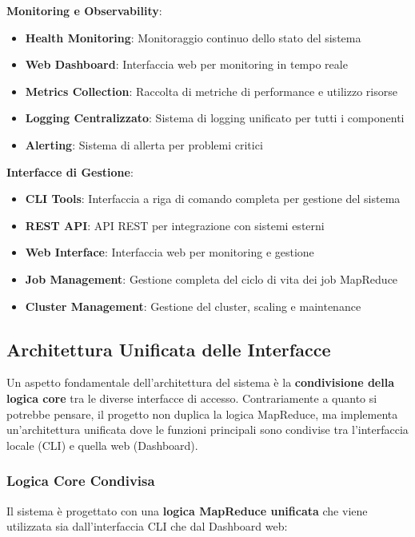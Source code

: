 \documentclass[12pt,a4paper]{article}
\begin{document}
\textbf{Monitoring e Observability}:
\begin{itemize}
\item \textbf{Health Monitoring}: Monitoraggio continuo dello stato del sistema
\item \textbf{Web Dashboard}: Interfaccia web per monitoring in tempo reale
\item \textbf{Metrics Collection}: Raccolta di metriche di performance e utilizzo risorse
\item \textbf{Logging Centralizzato}: Sistema di logging unificato per tutti i componenti
\item \textbf{Alerting}: Sistema di allerta per problemi critici
\end{itemize}

\textbf{Interfacce di Gestione}:
\begin{itemize}
\item \textbf{CLI Tools}: Interfaccia a riga di comando completa per gestione del sistema
\item \textbf{REST API}: API REST per integrazione con sistemi esterni
\item \textbf{Web Interface}: Interfaccia web per monitoring e gestione
\item \textbf{Job Management}: Gestione completa del ciclo di vita dei job MapReduce
\item \textbf{Cluster Management}: Gestione del cluster, scaling e maintenance
\end{itemize}

\subsection{Architettura Unificata delle Interfacce}

Un aspetto fondamentale dell'architettura del sistema è la \textbf{condivisione della logica core} tra le diverse interfacce di accesso. Contrariamente a quanto si potrebbe pensare, il progetto non duplica la logica MapReduce, ma implementa un'architettura unificata dove le funzioni principali sono condivise tra l'interfaccia locale (CLI) e quella web (Dashboard).

\subsubsection{Logica Core Condivisa}

Il sistema è progettato con una \textbf{logica MapReduce unificata} che viene utilizzata sia dall'interfaccia CLI che dal Dashboard web:
\end{document}
